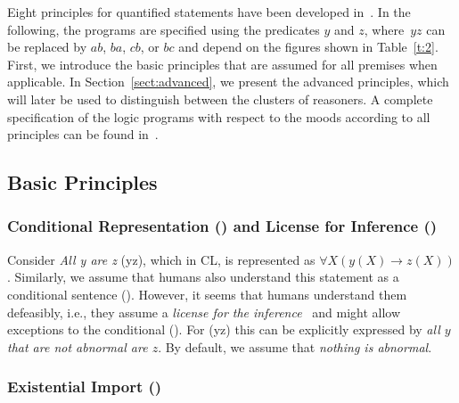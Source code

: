 \documentclass[12pt]{article}
\begin{document}
Eight principles for quantified statements have been developed in~\cite{cogsci:2017,costa:dietz:Hoelldobler:2017,declare:2017}.
In the following, the programs are
specified using the predicates $y$ and $z$, where~$yz$ can be replaced by $ab$, $ba$, $cb$, or $bc$ and depend on the figures shown in Table~\ref{t:2}. First, we introduce the basic principles that are assumed for all premises when applicable.
In Section~\ref{sect:advanced}, we present the advanced principles, which will 
later be used to distinguish between the clusters of reasoners.
A complete specification of the logic programs with respect to the moods according to all principles can be found in~\cite{declare:2017}.

\subsection{Basic Principles}   \label{sect:basic}

\subsubsection{Conditional Representation (\conditionals) and License for Inference (\licenses)}\label{sect:condli}
Consider \textit{All y are z} ({\MA yz}), which in CL, is represented as $\forall X (y(X) \rightarrow z(X))$.
Similarly, we assume that humans also understand this statement as a conditional sentence (\conditionals).
However, it seems that humans understand them defeasibly, i.e., they assume a \textit{license for the inference}~\cite{stenning:vanlambalgen:2008} and might allow exceptions to the conditional (\licenses). For (\MA yz) this can be 
explicitly expressed by 
\textit{all $y$ that are not abnormal are $z$}.
By default, we assume that \textit{nothing is abnormal}. %

\subsubsection{Existential Import ()}
\end{document}
